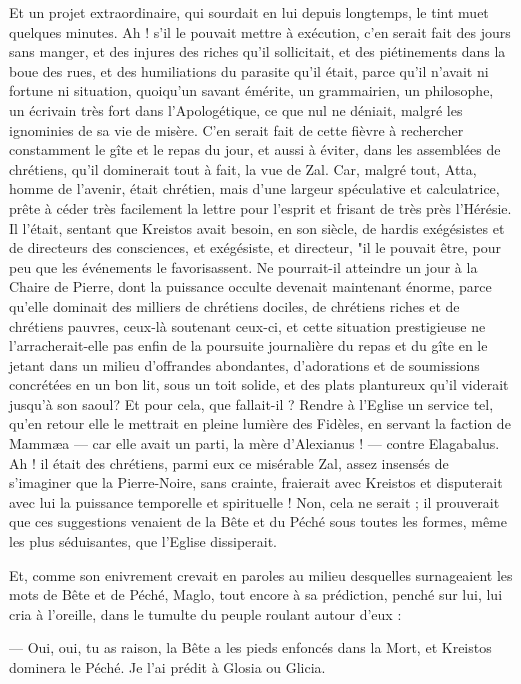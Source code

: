 \documentclass[a4paper, 11pt, oneside, polutonikogreek, french]{article}
\begin{document}
Et un projet extraordinaire, qui sourdait en lui depuis longtemps, le tint muet quelques minutes. Ah ! s'il le pouvait mettre à exécution, c'en serait fait des jours sans manger, et des injures des riches qu'il sollicitait, et des piétinements dans la boue des rues, et des humiliations du parasite qu'il était, parce qu'il n'avait ni fortune ni situation, quoiqu'un savant émérite, un grammairien, un philosophe, un écrivain très fort dans l'Apologétique, ce que nul ne déniait, malgré les ignominies de sa vie de misère. C'en serait fait de cette fièvre à rechercher constamment le gîte et le repas du jour, et aussi à éviter, dans les assemblées de chrétiens, qu'il dominerait tout à fait, la vue de Zal. Car, malgré tout, Atta, homme de l'avenir, était chrétien, mais d'une largeur spéculative et calculatrice, prête à céder très facilement la lettre pour l'esprit et frisant de très près l'Hérésie. Il l'était, sentant que Kreistos avait besoin, en son siècle, de hardis exégésistes et de directeurs des consciences, et exégésiste, et directeur, "il le pouvait être, pour peu que les événements le favorisassent. Ne pourrait-il atteindre un jour à la Chaire de Pierre, dont la puissance occulte devenait maintenant énorme, parce qu'elle dominait des milliers de chrétiens dociles, de chrétiens riches et de chrétiens pauvres, ceux-là soutenant ceux-ci, et cette situation prestigieuse ne l'arracherait-elle pas enfin de la poursuite journalière du repas et du gîte en le jetant dans un milieu d'offrandes abondantes, d'adorations et de soumissions concrétées en un bon lit, sous un toit solide, et des plats plantureux qu'il viderait jusqu'à son saoul? Et pour cela, que fallait-il ? Rendre à l'Eglise un service tel, qu'en retour elle le mettrait en pleine lumière des Fidèles, en servant la faction de Mammæa --- car elle avait un parti, la mère d'Alexianus ! --- contre Elagabalus. Ah ! il était des chrétiens, parmi eux ce misérable Zal, assez insensés de s'imaginer que la Pierre-Noire, sans crainte, fraierait avec Kreistos et disputerait avec lui la puissance temporelle et spirituelle ! Non, cela ne serait ; il prouverait que ces suggestions venaient de la Bête et du Péché sous toutes les formes, même les plus séduisantes, que l'Eglise dissiperait.

Et, comme son enivrement crevait en paroles au milieu desquelles surnageaient les mots de Bête et de Péché, Maglo, tout encore à sa prédiction, penché sur lui, lui cria à l'oreille, dans le tumulte du peuple roulant autour d'eux :

--- Oui, oui, tu as raison, la Bête a les pieds enfoncés dans la Mort, et Kreistos dominera le Péché. Je l'ai prédit à Glosia ou Glicia.
\end{document}
